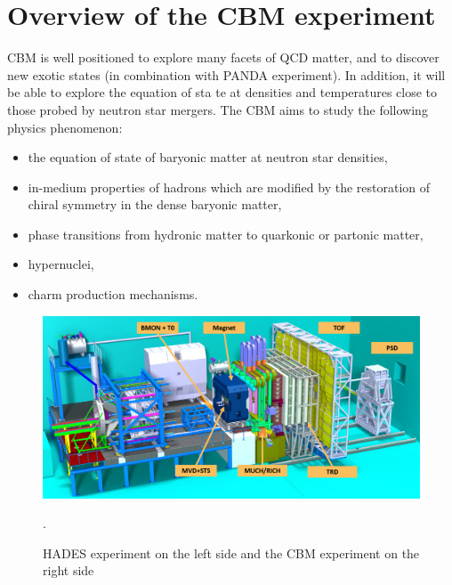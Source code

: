 
\section{Overview of the CBM experiment}

\gls{CBM} is well positioned to explore many facets of \gls{QCD} matter, and to discover new exotic states (in combination with \gls{PANDA} experiment). In addition, it will be able to explore the equation of sta  te at densities and temperatures close to those probed by neutron star mergers. The \gls{CBM} aims to study the following physics phenomenon:
\begin{itemize}
    \item the equation of state of baryonic matter at neutron star densities,
    \item in-medium properties of hadrons which are modified by the restoration of chiral symmetry in the dense baryonic matter, 
    \item phase transitions from hydronic matter to quarkonic or partonic matter,
    \item hypernuclei,
    \item charm production mechanisms.
\end{itemize}



\begin{figure}[!h]
    \centering
    \includegraphics[width=0.95\columnwidth]{Chapter1/images/CBMnew.png}
    \caption{HADES experiment on the left side and the \gls{CBM} experiment on the right side}.
    \label{fig:exp}
\end{figure}

